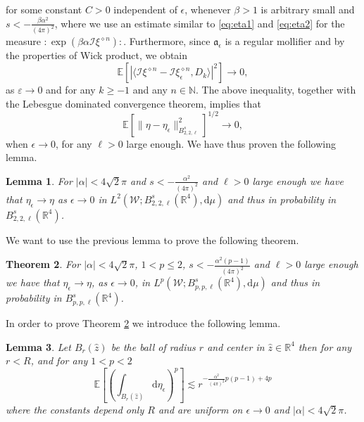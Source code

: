 \documentclass[a4paper,10pt]{article}
\newcommand{\mathd}{\mathrm{d}}
\newtheorem{theorem}{Theorem}
\newtheorem{lemma}[theorem]{Lemma}
\begin{document}
for some constant $C > 0$ independent of $\epsilon$, whenever $\beta > 1$ is
arbitrary small and $s < - \frac{\beta \alpha^2}{(4 \pi)^2}$, where we use an
estimate similar to {\eqref{eq:eta1}} and {\eqref{eq:eta2}} for the measure $:
\exp (\beta \alpha \mathcal{I} \xi^{\diamond n}) :$. Furthermore, since
$\mathfrak{a}_{\epsilon}$ is a regular mollifier and by the properties of Wick
product, we obtain
\[ \mathbb{E} [| \langle \mathcal{I} \xi^{\diamond n} - \mathcal{I}
   \xi_{\epsilon}^{\diamond n}, D_k \rangle |^2] \rightarrow 0, \]
as $\varepsilon \rightarrow 0$ and for any $k \geq - 1$ and any $n \in
\mathbb{N}$. The above inequality, together with the Lebesgue dominated
convergence theorem, implies that
\[ \mathbb{E} [\| \eta - \eta_{\epsilon} \|_{B^s_{2, 2, \ell}}^2]^{1 / 2}
   \rightarrow 0, \]
when $\epsilon \rightarrow 0$, for any $\ell > 0$ large enough. We have thus
proven the following lemma.

\begin{lemma}
  \label{lemma_L2}For $| \alpha | < 4 \sqrt{2} \pi$ and $s < -
  \frac{\alpha^2}{(4 \pi)^2}$ and $\ell > 0$ large enough we have that
  $\eta_{\epsilon} \rightarrow \eta$ as $\epsilon \rightarrow 0$ in $L^2
  (\mathcal{W} ; B^s_{2, 2, \ell} (\mathbb{R}^4), \mathd \mu)$ and thus in
  probability in $B^s_{2, 2, \ell} (\mathbb{R}^4)$.
\end{lemma}

We want to use the previous lemma to prove the following theorem.

\begin{theorem}
  \label{theorem_Lp}For $| \alpha | < 4 \sqrt{2} \pi$, $1 < p \leqslant 2$, $s
  < - \frac{\alpha^2 (p - 1)}{(4 \pi)^2}$ and $\ell > 0$ large enough we have
  that $\eta_{\epsilon} \rightarrow \eta$, as $\epsilon \rightarrow 0$, in
  $L^p (\mathcal{W} ; B^s_{p, p, \ell} (\mathbb{R}^4), \mathd \mu)$ and thus
  in probability in $B^s_{p, p, \ell} (\mathbb{R}^4)$.
\end{theorem}

In order to prove Theorem \ref{theorem_Lp} we introduce the following lemma.

\begin{lemma}
  \label{lemma_garban}Let $B_r (\hat{z})$ be the ball of radius $r$ and center
  in $\hat{z} \in \mathbb{R}^4$ then for any $r < R$, and for any $1 < p < 2$
  \[ \mathbb{E} \left[ \left( \int_{B_r (\hat{z})} \mathd \eta_{\epsilon}
     \right)^p \right] \lesssim r^{- \frac{\alpha^2}{(4 \pi)^2} p (p - 1) + 4
     p} \]
  where the constants depend only $R$ and are uniform on $\epsilon \rightarrow
  0$ and $| \alpha | < 4 \sqrt{2} \pi$.
\end{lemma}
\end{document}
